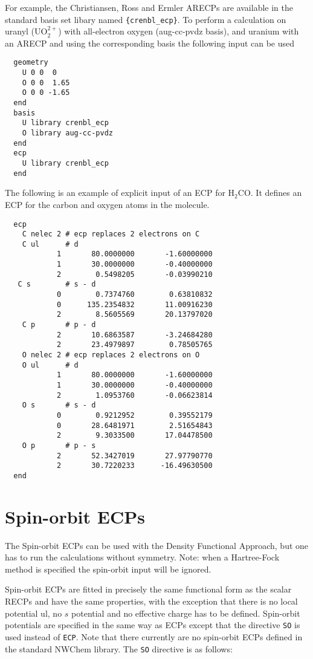 For example, the Christiansen, Ross and Ermler ARECPs are available in
the standard basis set libary named \verb+{crenbl_ecp}+.  To perform a
calculation on uranyl (UO$_2^{2+}$) with all-electron oxygen
(aug-cc-pvdz basis), and uranium with an ARECP and using the
corresponding basis the following input can be used
\begin{verbatim}
  geometry
    U 0 0  0
    O 0 0  1.65
    O 0 0 -1.65
  end
  basis 
    U library crenbl_ecp
    O library aug-cc-pvdz
  end
  ecp
    U library crenbl_ecp
  end
\end{verbatim}

The following is an example of explicit input of an ECP for H$_2$CO.
It defines an ECP for the carbon and oxygen atoms in the molecule.


\begin{verbatim}
  ecp
    C nelec 2 # ecp replaces 2 electrons on C
    C ul      # d
            1       80.0000000       -1.60000000
            1       30.0000000       -0.40000000
            2        0.5498205       -0.03990210
   C s        # s - d 
            0        0.7374760        0.63810832
            0      135.2354832       11.00916230
            2        8.5605569       20.13797020
    C p       # p - d
            2       10.6863587       -3.24684280
            2       23.4979897        0.78505765
    O nelec 2 # ecp replaces 2 electrons on O
    O ul      # d 
            1       80.0000000       -1.60000000
            1       30.0000000       -0.40000000
            2        1.0953760       -0.06623814
    O s       # s - d
            0        0.9212952        0.39552179
            0       28.6481971        2.51654843
            2        9.3033500       17.04478500
    O p       # p - s 
            2       52.3427019       27.97790770
            2       30.7220233      -16.49630500
  end
\end{verbatim}

\section{Spin-orbit ECPs}
\label{sec:spinorb_ecp}

The Spin-orbit ECPs can be used with the Density Functional Approach, but 
one has to run the calculations without symmetry. Note: when a Hartree-Fock
method is specified the spin-orbit input will be ignored.

Spin-orbit ECPs are fitted in precisely the same functional form as the
scalar RECPs and have the same properties, with the exception that there is
no local potential ul, no $s$ potential and no effective charge has to be
defined. Spin-orbit potentials are
specified in the same way as ECPs except that the directive \verb+SO+ is
used instead of \verb+ECP+. Note that there currently are no spin-orbit
ECPs defined in the standard NWChem library.  The \verb+SO+ 
directive is as follows:

